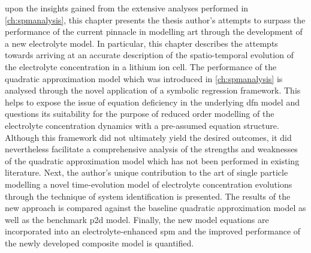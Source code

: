 
  upon  the insights  gained  from  the extensive  analyses
performed in  \cref{ch:spmanalysis}, this  chapter presents the  thesis author's
attempts to  surpass the performance  of the  current pinnacle in  modelling art
through the development of a new  electrolyte model. In particular, this chapter
describes  the attempts  towards  arriving  at an  accurate  description of  the
spatio-temporal  evolution of  the electrolyte  concentration in  a lithium  ion
cell. The performance of the  quadratic approximation model which was introduced
in  \cref{ch:spmanalysis}  is  analysed  through  the  novel  application  of  a
symbolic  regression framework.  This  helps  to expose  the  issue of  equation
deficiency in the  underlying \gls{dfn} model and questions  its suitability for
the  purpose  of  reduced  order  modelling  of  the  electrolyte  concentration
dynamics with a pre-assumed equation  structure. Although this framework did not
ultimately  yield  the  desired  outcomes,  it  did  nevertheless  facilitate  a
comprehensive  analysis  of  the  strengths  and  weaknesses  of  the  quadratic
approximation model which  has not been performed in  existing literature. Next,
the author's unique contribution to the  art of single particle modelling \viz{}
a novel time-evolution model of electrolyte concentration evolutions through the
technique of system identification is presented. The results of the new approach
is compared  against the baseline quadratic  approximation model as well  as the
benchmark \gls{p2d}  model. Finally,  the new  model equations  are incorporated
into an electrolyte-enhanced \gls{spm} and the improved performance of the newly
developed composite model is quantified.

